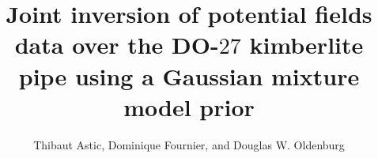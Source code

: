 \documentclass[paper, twocolumn]{geophysics} %
\begin{document}
\title{Joint inversion of potential fields data over the DO-$27$ kimberlite pipe using a Gaussian mixture model prior\footnotemark[1]}

\renewcommand{\thefootnote}{\fnsymbol{footnote}}


\address{\\
\footnotemark[1] DOI: \url{https://doi.org/10.1190/int-2019-0283.1} \\
\footnotemark[2] Geophysical Inversion Facility,
\footnotemark[3] Mira Geoscience
}
\author{Thibaut Astic\footnotemark[2], Dominique Fournier\footnotemark[3],
and Douglas W. Oldenburg\footnotemark[2]}


\maketitle

\end{document}
